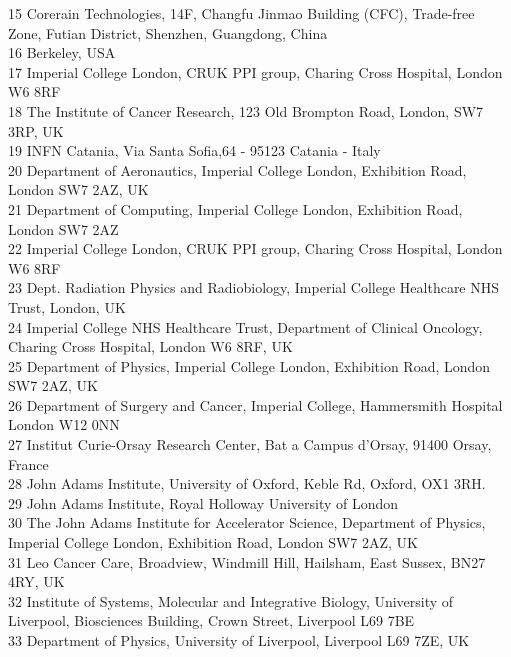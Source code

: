 {\begin{tabbing}
     15 \> Corerain Technologies, 14F, Changfu Jinmao Building (CFC), Trade-free Zone, Futian District, Shenzhen, Guangdong, China\\
     16 \> Berkeley, USA\\
     17 \> Imperial College London, CRUK PPI group, Charing Cross Hospital, London W6 8RF\\
     18 \> The Institute of Cancer Research, 123 Old Brompton Road, London, SW7 3RP, UK\\
     19 \> INFN Catania, Via Santa Sofia,64 - 95123 Catania - Italy\\
     20 \> Department of Aeronautics, Imperial College London, Exhibition Road, London SW7 2AZ, UK\\
     21 \> Department of Computing, Imperial College London, Exhibition Road, London SW7 2AZ\\
     22 \> Imperial College London, CRUK PPI group, Charing Cross Hospital, London W6 8RF\\
     23 \> Dept. Radiation Physics and Radiobiology, Imperial College Healthcare NHS Trust, London, UK\\
     24 \> Imperial College NHS Healthcare Trust, Department of Clinical Oncology, Charing Cross Hospital, London W6 8RF, UK\\
     25 \> Department of Physics, Imperial College London, Exhibition Road, London SW7 2AZ, UK\\
     26 \> Department of Surgery and Cancer, Imperial College, Hammersmith Hospital London W12 0NN\\
     27 \> Institut Curie-Orsay Research Center, Bat a Campus d'Orsay, 91400 Orsay, France\\
     28 \> John Adams Institute, University of Oxford, Keble Rd, Oxford, OX1 3RH.\\
     29 \> John Adams Institute, Royal Holloway University of London\\
     30 \> The John Adams Institute for Accelerator Science, Department of Physics, Imperial College London, Exhibition Road, London SW7 2AZ, UK\\
     31 \> Leo Cancer Care, Broadview, Windmill Hill, Hailsham, East Sussex, BN27 4RY, UK\\
     32 \> Institute of Systems, Molecular and Integrative Biology, University of Liverpool, Biosciences Building, Crown Street, Liverpool L69 7BE\\
     33 \> Department of Physics, University of Liverpool, Liverpool L69 7ZE, UK\\

\end{tabbing}}
